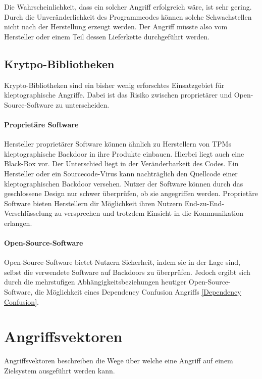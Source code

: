             Die Wahrscheinlichkeit, dass ein solcher Angriff erfolgreich wäre, ist sehr gering. Durch die Unveränderlichkeit des Programmcodes können solche Schwachstellen nicht nach der Herstellung erzeugt werden. Der Angriff müsste also vom Hersteller oder einem Teil dessen Lieferkette durchgeführt werden.

        \subsection{Krytpo-Bibliotheken}
            Krypto-Bibliotheken sind ein bisher wenig erforschtes Einsatzgebiet für kleptographische Angriffe. Dabei ist das Risiko zwischen proprietärer und Open-Source-Software zu unterscheiden.

            \paragraph{Proprietäre Software}
                Hersteller proprietärer Software können ähnlich zu Herstellern von \ac{TPM}s kleptographische Backdoor in ihre Produkte einbauen. Hierbei liegt auch eine Black-Box vor. Der Unterschied liegt in der Veränderbarkeit des Codes. Ein Hersteller oder ein Sourcecode-Virus kann nachträglich den Quellcode einer kleptographischen Backdoor versehen.
                Nutzer der Software können durch das geschlossene Design nur schwer überprüfen, ob sie angegriffen werden. Proprietäre Software bieten Herstellern dir Möglichkeit ihren Nutzern End-zu-End-Verschlüsselung zu versprechen und trotzdem Einsicht in die Kommunikation erlangen.

            \paragraph{Open-Source-Software}
                Open-Source-Software bietet Nutzern Sicherheit, indem sie in der Lage sind, selbst die verwendete Software auf Backdoors zu überprüfen. Jedoch ergibt sich durch die mehrstufigen Abhängigkeitsbeziehungen heutiger Open-Source-Software, die Möglichkeit eines Dependency Confusion Angriffs \ref{Dependency Confusion}.

    \section{Angriffsvektoren}
        Angriffsvektoren beschreiben die Wege über welche eine Angriff auf einem Zielsystem ausgeführt werden kann. 

